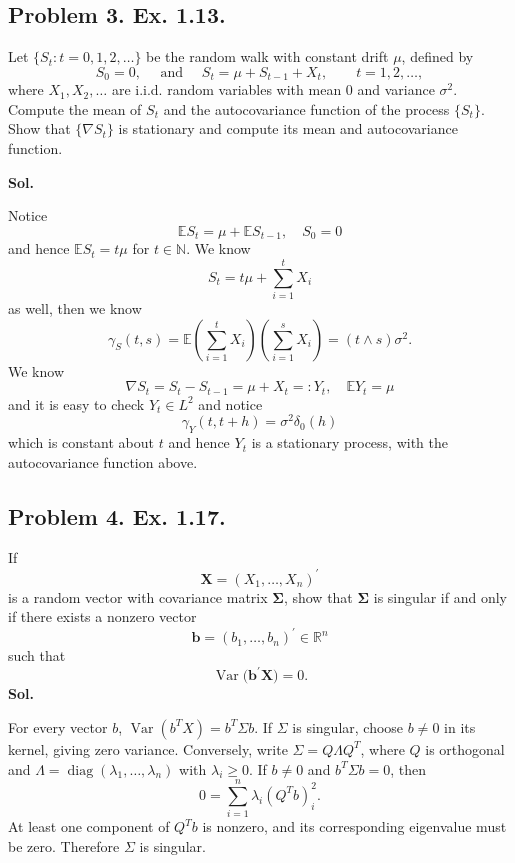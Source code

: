 \documentclass[lang=en,11pt,a4paper,citestyle =authoryear]{elegantpaper}
\begin{document}
\subsection*{Problem 3. Ex. 1.13.} 

Let $\{S_t:t=0,1,2,\ldots\}$ be the random walk with constant drift
$\mu$, defined by
\[
S_0=0,\quad\text{ and }\quad
S_t=\mu+S_{t-1}+X_t,
\qquad
t=1,2,\ldots,
\]
where $X_1,X_2,\ldots$ are i.i.d.
random variables with mean $0$ and variance $\sigma^2$. Compute the mean of $S_t$ and the autocovariance function of the
process $\{S_t\}$. Show that $\{\nabla S_t\}$ is stationary and
compute its mean and autocovariance function.\par
\vspace{0.5em}
\textbf{Sol.} \par
Notice
\[
\mathbb{E}S_t = \mu + \mathbb{E}S_{t-1},\quad S_0 = 0
\]
and hence $\mathbb{E}S_t = t\mu$ for $t\in\mathbb{N}$. We know
\[S_t = t\mu + \sum\limits_{i=1}^t X_i\]
as well, then we know
\[
\gamma_S(t,s) = \mathbb{E}\left(\sum\limits_{i=1}^t X_i\right)\left(\sum\limits_{i=1}^{s} X_i\right) = (t\wedge s)\sigma^2. 
\]
We know
\[\nabla S_t = S_t - S_{t-1} = \mu +X_t =: Y_t, \quad \mathbb{E}Y_t = \mu\]
and it is easy to check $Y_t \in L^2$ and notice
\[
\gamma_Y(t,t+h) = \sigma^2\delta_{0}(h)
\]
which is constant about $t$ and hence $Y_t$ is a stationary process, with the autocovariance function above.
\par 
\vspace{0.5em}

\subsection*{Problem 4. Ex. 1.17.} 

If
\[
\mathbf{X}=(X_1,\ldots,X_n)^\prime
\]
is a random vector with covariance matrix $\boldsymbol{\Sigma}$,
show that $\boldsymbol{\Sigma}$ is singular if and only if there
exists a nonzero vector
\[
\mathbf{b}=(b_1,\ldots,b_n)^\prime\in\mathbb{R}^n
\]
such that
\[
\operatorname{Var}\bigl(\mathbf{b}^\prime\mathbf{X}\bigr)=0.
\]
\vspace{0.5em}
\textbf{Sol.} \par
For every vector $b$, $\operatorname{Var}(b^T X)=b^T\Sigma b$.
If $\Sigma$ is singular, choose $b\ne0$ in its kernel, giving zero variance.
Conversely, write $\Sigma=Q\Lambda Q^T$, where $Q$ is orthogonal and
$\Lambda=\operatorname{diag}(\lambda_1,\ldots,\lambda_n)$ with $\lambda_i\ge0$.
If $b\ne0$ and $b^T\Sigma b=0$, then
\[
0=\sum_{i=1}^n\lambda_i (Q^Tb)_i^2.
\]
At least one component of $Q^Tb$ is nonzero, and its corresponding eigenvalue
must be zero. Therefore $\Sigma$ is singular.
\par\vspace{0.5em}
\end{document}
